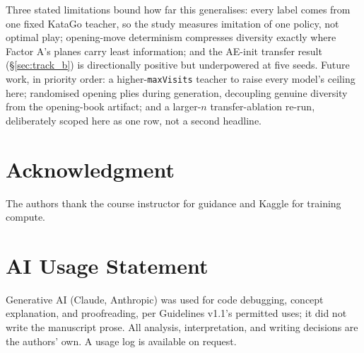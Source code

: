 \documentclass[conference,a4paper]{IEEEtran}
\newif\ifanon
\begin{document}
Three stated limitations bound how far this generalises: every label comes
from one fixed KataGo teacher, so the study measures imitation of one
policy, not optimal play; opening-move determinism compresses diversity
exactly where Factor A's planes carry least information; and the AE-init
transfer result (\S\ref{sec:track_b}) is directionally positive but
underpowered at five seeds. Future work, in priority order: a
higher-\texttt{maxVisits} teacher to raise every model's ceiling here;
randomised opening plies during generation, decoupling genuine diversity
from the opening-book artifact; and a larger-$n$ transfer-ablation re-run,
deliberately scoped here as one row, not a second headline.

\section*{Acknowledgment}
\ifanon
  Withheld for double-blind review.
\else
  The authors thank the course instructor for guidance and Kaggle for
  training compute.
\fi

\section*{AI Usage Statement}
Generative AI (Claude, Anthropic) was used for code debugging, concept
explanation, and proofreading, per Guidelines v1.1's permitted uses; it did
not write the manuscript prose. All analysis, interpretation, and writing
decisions are the authors' own.\ifanon\else{} A usage log is available on
request.\fi



\end{document}

